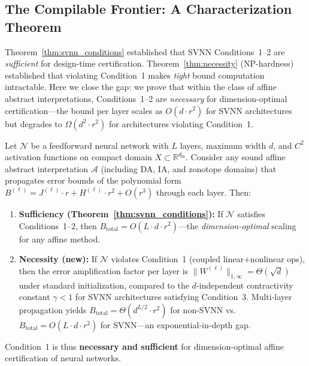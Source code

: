 \subsection{The Compilable Frontier: A Characterization Theorem}
\label{sec:characterization}

Theorem~\ref{thm:svnn_conditions} established that SVNN Conditions~1--2 are
\textit{sufficient} for design-time certification. Theorem~\ref{thm:necessity}
(NP-hardness) established that violating Condition~1 makes \textit{tight}
bound computation intractable. Here we close the gap: we prove that within
the class of affine abstract interpretations, Conditions~1--2 are
\textit{necessary} for dimension-optimal certification---the bound per layer
scales as $O(d \cdot r^2)$ for SVNN architectures but degrades to
$\Omega(d^2 \cdot r^2)$ for architectures violating Condition~1.

\vspace{4pt}
\begin{kingthm}
\label{thm:characterization}
Let $\mathcal{N}$ be a feedforward neural network with $L$ layers, maximum
width $d$, and $C^2$ activation functions on compact domain $X \subset
\mathbb{R}^{d_{\text{in}}}$. Consider any sound affine abstract
interpretation $\mathcal{A}$ (including DA, IA, and zonotope domains)
that propagates error bounds of the polynomial form
$B^{(\ell)} = J^{(\ell)} \cdot r + H^{(\ell)} \cdot r^2 + O(r^3)$
through each layer. Then:

\begin{enumerate}[label=(\roman*)]
    \item \textbf{Sufficiency (Theorem~\ref{thm:svnn_conditions}):}
    If $\mathcal{N}$ satisfies Conditions~1--2, then
    $B_{\text{total}} = O(L \cdot d \cdot r^2)$---the
    \textit{dimension-optimal} scaling for any affine method.

    \item \textbf{Necessity (new):}
    If $\mathcal{N}$ violates Condition~1 (coupled linear+nonlinear ops),
    then the error amplification factor per layer is
    $\|W^{(\ell)}\|_{1,\infty} = \Theta(\sqrt{d})$ under standard
    initialization, compared to the $d$-independent contractivity
    constant $\gamma < 1$ for SVNN architectures satisfying
    Condition~3. Multi-layer propagation yields
    $B_{\text{total}} = \Theta(d^{L/2} \cdot r^2)$ for non-SVNN vs.
    $B_{\text{total}} = O(L \cdot d \cdot r^2)$ for SVNN---an
    exponential-in-depth gap.
\end{enumerate}

Condition~1 is thus \textbf{necessary and sufficient} for
dimension-optimal affine certification of neural networks.
\label{thm:frontier}
\end{kingthm}

